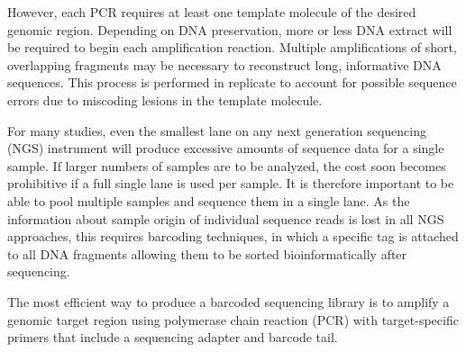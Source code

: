 \documentclass[]{article}
\begin{document}
However, each PCR requires at least one template molecule of the desired
genomic region. Depending on DNA preservation, more or less DNA extract
will be required to begin each amplification reaction. Multiple
amplifications of short, overlapping fragments may be necessary to
reconstruct long, informative DNA sequences. This process is performed
in replicate to account for possible sequence errors due to miscoding
lesions in the template molecule.

For many studies, even the smallest lane on any next generation
sequencing (NGS) instrument will produce excessive amounts of sequence
data for a single sample. If larger numbers of samples are to be
analyzed, the cost soon becomes prohibitive if a full single lane is
used per sample. It is therefore important to be able to pool multiple
samples and sequence them in a single lane. As the information about
sample origin of individual sequence reads is lost in all NGS
approaches, this requires barcoding techniques, in which a specific tag
is attached to all DNA fragments allowing them to be sorted
bioinformatically after sequencing.

The most efficient way to produce a barcoded sequencing library is to
amplify a genomic target region using polymerase chain reaction (PCR)
with target-specific primers that include a sequencing adapter and
barcode tail.
\end{document}
